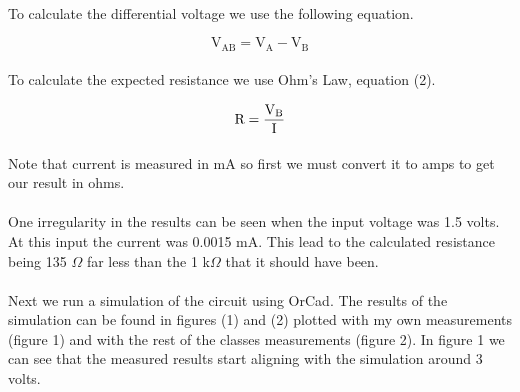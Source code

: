 \documentclass{article}
\begin{document}
\paragraph{}
To calculate the differential voltage we use the following equation.

\begin{equation}
	\text{V}_\text{AB} = \text{V}_\text{A} - \text{V}_\text{B}
\end{equation}

\paragraph{}
To calculate the expected resistance we use Ohm's Law, equation (2).

\begin{equation}
	\text{R} = {\text{V}_\text{B} \over \text{I}}
\end{equation}

\paragraph{}
Note that current is measured in mA so first we must convert it to amps to get our result in ohms.

\paragraph{}
One irregularity in the results can be seen when the input voltage was 1.5 volts. At this input the current was 0.0015 mA. This lead to the calculated resistance being 135 $\Omega$ far less than the 1 k$\Omega$ that it should have been. 

\paragraph{}
Next we run a simulation of the circuit using OrCad. The results of the simulation can be found in figures (1) and (2) plotted with my own measurements (figure 1) and with the rest of the classes measurements (figure 2). In figure 1 we can see that the measured results start aligning with the simulation around 3 volts.
\end{document}
